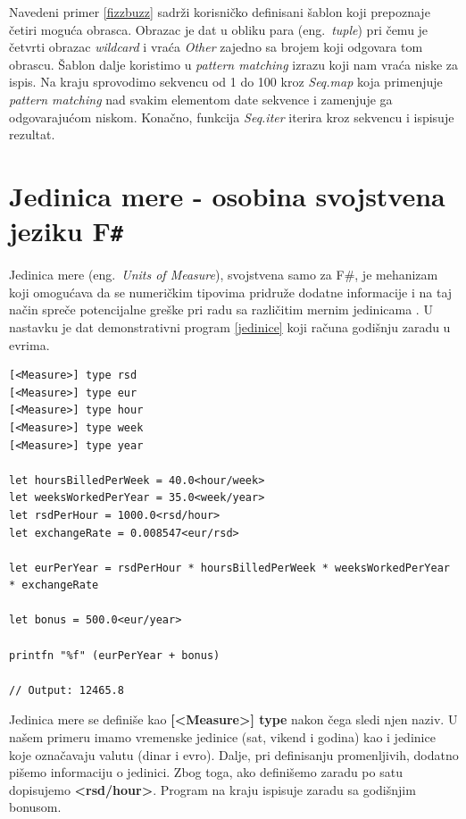 \documentclass[a4paper]{article}
\begin{document}
Navedeni primer \ref{fizzbuzz} sadrži korisničko definisani šablon koji prepoznaje četiri moguća obrasca. Obrazac je dat u obliku para (eng.~{\em tuple}) pri čemu je četvrti obrazac \textit{wildcard} i vraća \textit{Other} zajedno sa brojem koji odgovara tom obrascu. Šablon dalje koristimo u \textit{pattern matching} izrazu koji nam vraća niske za ispis. Na kraju sprovodimo sekvencu od 1 do 100 kroz \textit{Seq.map} koja primenjuje \textit{pattern matching} nad svakim elementom date sekvence i zamenjuje ga odgovarajućom niskom. Konačno, funkcija \textit{Seq.iter} iterira kroz sekvencu i ispisuje rezultat.

\section{Jedinica mere - osobina svojstvena jeziku F\texttt{\#}}
Jedinica mere (eng.~{\em Units of Measure}), svojstvena samo za F\#, je mehanizam koji omogućava da se numeričkim tipovima pridruže dodatne informacije i na taj način spreče potencijalne greške pri radu sa različitim mernim jedinicama \cite{unitsOfMeasure}. U nastavku je dat demonstrativni program \ref{jedinice} koji računa godišnju zaradu u evrima. \\

\begin{lstlisting}[caption={Primer jedinice mere \cite{unitsOfMeasureExample}},frame=single, label=jedinice]
[<Measure>] type rsd
[<Measure>] type eur
[<Measure>] type hour
[<Measure>] type week
[<Measure>] type year

let hoursBilledPerWeek = 40.0<hour/week>
let weeksWorkedPerYear = 35.0<week/year>
let rsdPerHour = 1000.0<rsd/hour>
let exchangeRate = 0.008547<eur/rsd>

let eurPerYear = rsdPerHour * hoursBilledPerWeek * weeksWorkedPerYear * exchangeRate

let bonus = 500.0<eur/year>

printfn "%f" (eurPerYear + bonus)

// Output: 12465.8

\end{lstlisting}

Jedinica mere se definiše kao \textbf{[<Measure>] type} nakon čega sledi njen naziv. U našem primeru imamo vremenske jedinice (sat, vikend i godina) kao i jedinice koje označavaju valutu (dinar i evro). Dalje, pri definisanju promenljivih, dodatno pišemo informaciju o jedinici. Zbog toga, ako definišemo zaradu po satu dopisujemo \textbf{<rsd/hour>}. Program na kraju ispisuje zaradu sa godišnjim bonusom. 
\end{document}
